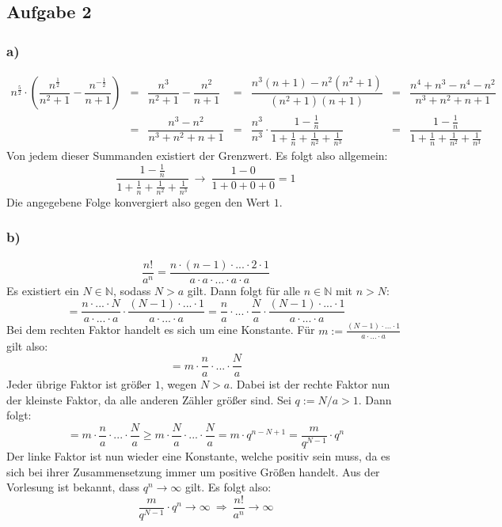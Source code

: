 \documentclass[10pt, a4paper]{article}
\begin{document}


	\newpage

	\subsection*{Aufgabe 2} %
	\label{sub:aufgabe_2}
	
		\subsubsection*{a)} %
		\label{ssub:a_}
		
			\begin{align*}
				n^{\frac{5}{2}}\cdot\left(\dfrac{n^{\frac{1}{2}}}{n^2+1} - \dfrac{n^{-\frac{1}{2}}}{n+1}\right) &=& \dfrac{n^3}{n^2+1} - \dfrac{n^2}{n+1} &=& \dfrac{n^3(n+1) - n^2(n^2+1)}{(n^2+1)(n+1)} &=& \dfrac{n^4 + n^3 - n^4 -n^2}{n^3+n^2+n+1}\\
				&=& \dfrac{n^3-n^2}{n^3+n^2+n+1} &=& \dfrac{n^3}{n^3}\cdot \dfrac{1-\frac{1}{n}}{1+\frac{1}{n}+\frac{1}{n^2}+\frac{1}{n^3}} &=& \dfrac{1-\frac{1}{n}}{1+\frac{1}{n}+\frac{1}{n^2}+\frac{1}{n^3}}
			\end{align*}
			Von jedem dieser Summanden existiert der Grenzwert. Es folgt also allgemein:
			\[
				\dfrac{1-\frac{1}{n}}{1+\frac{1}{n}+\frac{1}{n^2}+\frac{1}{n^3}} \ \longrightarrow \ \dfrac{1-0}{1+0+0+0} = 1
			\]
			Die angegebene Folge konvergiert also gegen den Wert $1$.


		\subsubsection*{b)} %
		\label{ssub:b_}
		
			\[
				\dfrac{n!}{a^n} = \dfrac{n\cdot(n-1)\cdot ... \cdot 2 \cdot 1}{a\cdot a\cdot ... \cdot a\cdot a}
			\]
			Es existiert ein $N \in \mathbb{N}$, sodass $N > a$ gilt. Dann folgt für alle $n \in \mathbb{N}$ mit $n > N$:
			\[
				= \dfrac{n\cdot ... \cdot N}{a\cdot ... \cdot a}\cdot \dfrac{(N-1)\cdot ... \cdot 1}{a\cdot ... \cdot a} = \dfrac{n}{a}\cdot ... \cdot \dfrac{N}{a} \cdot \dfrac{(N-1)\cdot ... \cdot 1}{a\cdot ... \cdot a}
			\]
			Bei dem rechten Faktor handelt es sich um eine Konstante. Für $m:= \frac{(N-1)\cdot ... \cdot 1}{a\cdot ... \cdot a}$ gilt also:
			\[
				= m\cdot \dfrac{n}{a}\cdot ... \cdot \dfrac{N}{a}
			\]
			Jeder übrige Faktor ist größer $1$, wegen $N>a$. Dabei ist der rechte Faktor nun der kleinste Faktor, da alle anderen Zähler größer sind. Sei $q:=N/a>1$. Dann folgt:
			\[
				=m\cdot \dfrac{n}{a}\cdot ... \cdot \dfrac{N}{a} \geq m \cdot \dfrac{N}{a}\cdot ... \cdot \dfrac{N}{a} = m\cdot q^{n-N+1} = \dfrac{m}{q^{N-1}}\cdot q^n
			\]
			Der linke Faktor ist nun wieder eine Konstante, welche positiv sein muss, da es sich bei ihrer Zusammensetzung immer um positive Größen handelt. Aus der Vorlesung ist bekannt, dass $q^n \longrightarrow \infty$ gilt. Es folgt also:
			\[
				\dfrac{m}{q^{N-1}}\cdot q^n \longrightarrow \infty \ \Rightarrow \ \dfrac{n!}{a^n} \longrightarrow \infty
			\]
\end{document}
